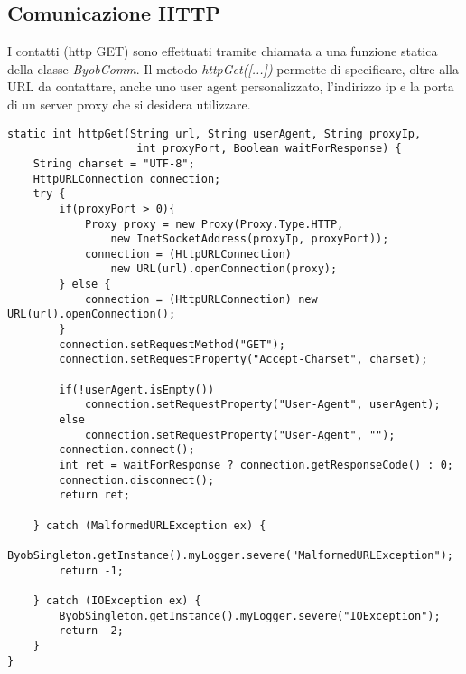 \subsection{Comunicazione HTTP}
I contatti (http GET) sono effettuati tramite chiamata a una funzione statica della classe \textit{ByobComm}.
Il metodo \textit{httpGet([...])} permette di specificare, oltre alla URL da contattare, anche uno user agent personalizzato, l'indirizzo ip e la porta di un server proxy che si desidera utilizzare.

\vspace{0.5cm}
\begin{lstlisting}
static int httpGet(String url, String userAgent, String proxyIp, 
					int proxyPort, Boolean waitForResponse) {  
    String charset = "UTF-8"; 
    HttpURLConnection connection;
    try {
	    if(proxyPort > 0){
		    Proxy proxy = new Proxy(Proxy.Type.HTTP, 
			    new InetSocketAddress(proxyIp, proxyPort));
		    connection = (HttpURLConnection) 
			    new URL(url).openConnection(proxy);
	    } else {
		    connection = (HttpURLConnection) new URL(url).openConnection();
	    }
	    connection.setRequestMethod("GET");
	    connection.setRequestProperty("Accept-Charset", charset);
	    
	    if(!userAgent.isEmpty())
		    connection.setRequestProperty("User-Agent", userAgent);
	    else
		    connection.setRequestProperty("User-Agent", "");
	    connection.connect();
	    int ret = waitForResponse ? connection.getResponseCode() : 0;
	    connection.disconnect();
	    return ret;
	    
    } catch (MalformedURLException ex) {
	    ByobSingleton.getInstance().myLogger.severe("MalformedURLException");
	    return -1;
    
    } catch (IOException ex) {
	    ByobSingleton.getInstance().myLogger.severe("IOException");
	    return -2; 
    }   
}
\end{lstlisting} 





